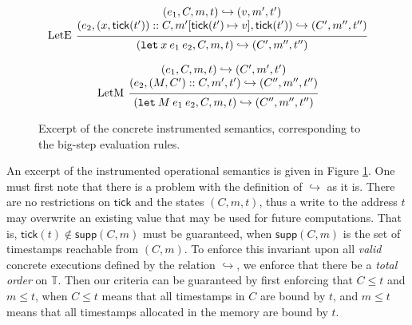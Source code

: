 \documentclass[acmsmall,screen,review]{acmart}\settopmatter{printfolios=true,printccs=false,printacmref=false}
\newcommand*{\cons}{::}
\newcommand*{\Time}{\mathbb{T}}
\newcommand*{\mem}{m}
\newcommand*{\semarrow}{\hookrightarrow}
\newcommand*{\tick}{\mathsf{tick}}
\begin{document}
\begin{figure}[t!]
  \[
    \begin{prooftree}
      \hypo{
        \begin{matrix}
          (e_{1}, C, \mem, t)
          \semarrow
          (v, \mem', t') \\
          (e_{2}, (x, \tick(t'))\cons C, \mem'[\tick(t')\mapsto v], \tick(t'))
          \semarrow
          (C', \mem'', t'')
        \end{matrix}
      }
      \infer[left label=LetE]1{
      (\mathtt{let}\:x\:e_1\:e_2, C, \mem, t)
      \semarrow
      (C', \mem'', t'')
      }
    \end{prooftree}
  \]

  \[
    \begin{prooftree}
      \hypo{
        \begin{matrix}
          (e_{1}, C, \mem, t)
          \semarrow
          (C', \mem', t') \\
          (e_{2}, (M, C')\cons C, \mem', t')
          \semarrow
          (C'', \mem'', t'')
        \end{matrix}
      }
      \infer[left label=LetM]1{
      (\mathtt{let}\:M\:e_{1}\:e_{2}, C, \mem, t)
      \semarrow
      (C'', \mem'', t'')
      }
    \end{prooftree}
  \]
  \caption{Excerpt of the concrete instrumented semantics, corresponding to the big-step evaluation rules.}
  \label{fig:concreach}
\end{figure}

An excerpt of the instrumented operational semantics is given in Figure \ref{fig:concreach}.
One must first note that there is a problem with the definition of $\semarrow$ as it is.
There are no restrictions on $\tick$ and the states $(C,\mem,t)$, thus a write to the address $t$ may overwrite an existing value that may be used for future computations.
That is, $\tick(t)\not\in\mathsf{supp}(C,\mem)$ must be guaranteed, when $\mathsf{supp}(C,\mem)$ is the set of timestamps reachable from $(C,\mem)$.
To enforce this invariant upon all \emph{valid} concrete executions defined by the relation $\semarrow$, we enforce that there be a \emph{total order} on $\Time$.
Then our criteria can be guaranteed by first enforcing that $C\le t$ and $\mem\le t$, when $C\le t$ means that all timestamps in $C$ are bound by $t$, and $\mem\le t$ means that all timestamps allocated in the memory are bound by $t$.
\end{document}
